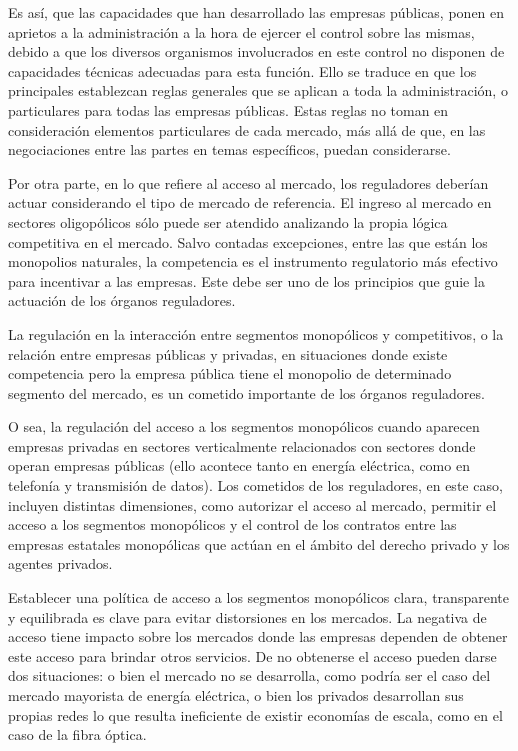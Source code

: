 \documentclass[
  12pt,
  spanish,
]{book}
\begin{document}
Es así, que las capacidades que han desarrollado las empresas públicas,
ponen en aprietos a la administración a la hora de ejercer el control
sobre las mismas, debido a que los diversos organismos involucrados en
este control no disponen de capacidades técnicas adecuadas para esta
función. Ello se traduce en que los principales establezcan reglas
generales que se aplican a toda la administración, o particulares para
todas las empresas públicas. Estas reglas no toman en consideración
elementos particulares de cada mercado, más allá de que, en las
negociaciones entre las partes en temas específicos, puedan
considerarse.

Por otra parte, en lo que refiere al acceso al mercado, los reguladores
deberían actuar considerando el tipo de mercado de referencia. El
ingreso al mercado en sectores oligopólicos sólo puede ser atendido
analizando la propia lógica competitiva en el mercado. Salvo contadas
excepciones, entre las que están los monopolios naturales, la
competencia es el instrumento regulatorio más efectivo para incentivar a
las empresas. Este debe ser uno de los principios que guie la actuación
de los órganos reguladores.

La regulación en la interacción entre segmentos monopólicos y
competitivos, o la relación entre empresas públicas y privadas, en
situaciones donde existe competencia pero la empresa pública tiene el
monopolio de determinado segmento del mercado, es un cometido importante
de los órganos reguladores.

O sea, la regulación del acceso a los segmentos monopólicos cuando
aparecen empresas privadas en sectores verticalmente relacionados con
sectores donde operan empresas públicas (ello acontece tanto en energía
eléctrica, como en telefonía y transmisión de datos). Los cometidos de
los reguladores, en este caso, incluyen distintas dimensiones, como
autorizar el acceso al mercado, permitir el acceso a los segmentos
monopólicos y el control de los contratos entre las empresas estatales
monopólicas que actúan en el ámbito del derecho privado y los agentes
privados.

Establecer una política de acceso a los segmentos monopólicos clara,
transparente y equilibrada es clave para evitar distorsiones en los
mercados. La negativa de acceso tiene impacto sobre los mercados donde
las empresas dependen de obtener este acceso para brindar otros
servicios. De no obtenerse el acceso pueden darse dos situaciones: o
bien el mercado no se desarrolla, como podría ser el caso del mercado
mayorista de energía eléctrica, o bien los privados desarrollan sus
propias redes lo que resulta ineficiente de existir economías de escala,
como en el caso de la fibra óptica.
\end{document}
